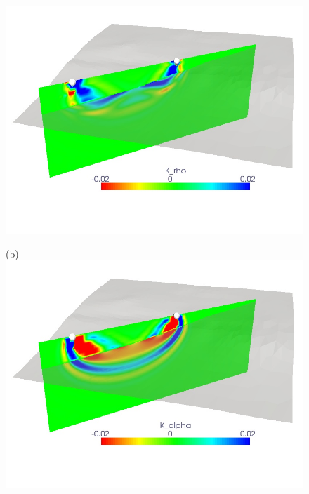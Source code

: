 \documentclass[referee,extra]{gji}
\begin{document}
\begin{figure}
\begin{center}
\begin{minipage}[t]{0.49\textwidth}
\begin{center}
\includegraphics[width=1.\textwidth]{./images/pearl_rho_kernel.jpg}
\end{center}
\end{minipage}
\begin{minipage}[t]{0.49\textwidth}
\begin{center}
(b)\\
\includegraphics[width=1.\textwidth]{./images/pearl_alpha_kernel.jpg}\\

\end{center}
\end{minipage}
\end{center}
\end{figure}
\end{document}
